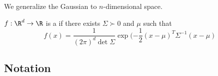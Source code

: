 

We generalize the Gaussian
to $n$-dimensional space.


$f: \R^d \to \R$ is a 
if there exists $\Sigma \succ 0$
and $\mu$ such that
\[
  f(x) = \frac{1}{(2\pi)^d \det \Sigma}
  \exp(-\frac{1}{2} (x - \mu)^T \Sigma^{-1} (x - \mu)
\]

\subsection{Notation}
